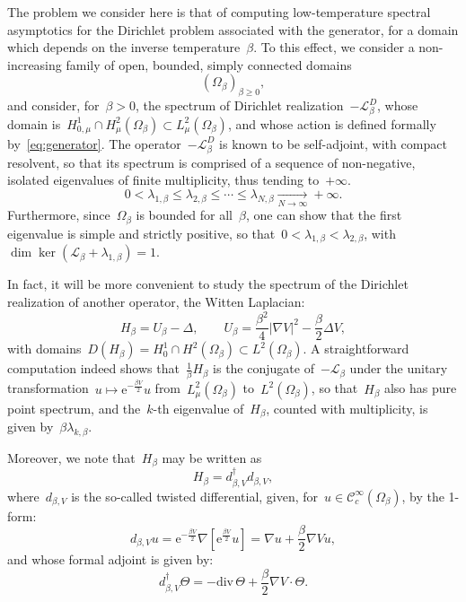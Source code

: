 \documentclass[10pt]{article}
\newcommand{\cL}{\mathcal{L}}
\newcommand{\e}{\mathrm{e}}
\renewcommand{\div}{\mathrm{div}}
\newcommand{\1}{\mathbbm 1}
\begin{document}
    The problem we consider here is that of computing low-temperature spectral asymptotics for the Dirichlet problem associated with the generator, for a domain which depends on the inverse temperature~$\beta$.
    To this effect, we consider a non-increasing family of open, bounded, simply connected domains
    \[(\Omega_\beta)_{\beta \geq 0},\]
    and consider, for~$\beta>0$, the spectrum of Dirichlet realization~$-\cL_\beta^D$, whose domain is~$H_{0,\mu}^1\cap H^2_{\mu}(\Omega_\beta) \subset L^2_\mu(\Omega_\beta)$,
    and whose action is defined formally by~\eqref{eq:generator}.
    The operator~$-\cL_\beta^D$ is known to be self-adjoint, with compact resolvent, so that its spectrum is comprised of a sequence of non-negative, isolated eigenvalues of finite multiplicity, thus tending to~$+\infty$.
   ~$$0<\lambda_{1,\beta} \leq \lambda_{2,\beta}\leq \dotsm \leq\lambda_{N,\beta} \underset{N\to\infty}{\longrightarrow}+\infty.$$
    Furthermore, since~$\Omega_\beta$ is bounded for all~$\beta$, one can show that the first eigenvalue is simple and strictly positive, so that~$0<\lambda_{1,\beta} < \lambda_{2,\beta}$, with~$\dim \ker \left(\cL_\beta+\lambda_{1,\beta}\right)=1$.

    In fact, it will be more convenient to study the spectrum of the Dirichlet realization of another operator, the Witten Laplacian:
    \begin{equation}
        \label{eq:witten_laplacian}
        H_{\beta} = U_\beta - \Delta,\qquad U_\beta = \frac{\beta^2}4|\nabla V|^2 - \frac{\beta}2 \Delta V,
    \end{equation}
    with domains~$D(H_\beta)=H_0^1\cap H^2(\Omega_\beta) \subset L^2(\Omega_\beta)$. A straightforward computation indeed shows that~$\frac1{\beta}H_\beta$ is the conjugate of~$-\cL_\beta$ under the unitary transformation~$u\mapsto \e^{-\frac{\beta V}2}u$ from~$L_\mu^2(\Omega_\beta)$ to~$L^2(\Omega_\beta)$, so that~$H_\beta$ also has pure point spectrum, and the~$k$-th eigenvalue of~$H_\beta$, counted with multiplicity, is given by~$\beta\lambda_{k,\beta}$.

    Moreover, we note that~$H_\beta$ may be written as
    \begin{equation}
        \label{eq:factorization_witten}
        H_\beta = d_{\beta,V}^\dagger d_{\beta,V},
    \end{equation}
    where~$d_{\beta,V}$ is the so-called twisted differential, given, for~$u\in \mathcal C_c^\infty(\Omega_\beta)$, by the 1-form:
    \begin{equation}
        \label{eq:twisted_differential}
        d_{\beta,V}u = \e^{-\frac{\beta V}2}\nabla\left[\e^{\frac{\beta V}2}u\right] = \nabla u + \frac\beta 2\nabla V u,
    \end{equation}
    and whose formal adjoint is given by:
    \begin{equation}
        \label{eq:twisted_differential_adjoint}
        d_{\beta,V}^\dagger \Theta = -\div\, \Theta +\frac\beta 2 \nabla V \cdot \Theta.
    \end{equation}
\end{document}
